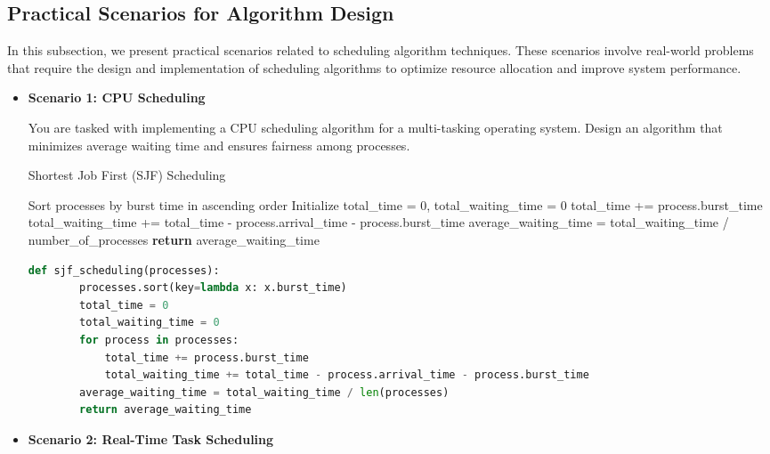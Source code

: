 \documentclass[12pt]{book} %
\begin{document}
\subsection{Practical Scenarios for Algorithm Design}
In this subsection, we present practical scenarios related to scheduling algorithm techniques. These scenarios involve real-world problems that require the design and implementation of scheduling algorithms to optimize resource allocation and improve system performance.

\begin{itemize}
    \item \textbf{Scenario 1: CPU Scheduling}
    
    You are tasked with implementing a CPU scheduling algorithm for a multi-tasking operating system. Design an algorithm that minimizes average waiting time and ensures fairness among processes.
    
    \begin{algorithm}[H]
        \caption{Shortest Job First (SJF) Scheduling}
        \begin{algorithmic}[1]
            \State Sort processes by burst time in ascending order
            \State Initialize total\_time = 0, total\_waiting\_time = 0
                \State total\_time += process.burst\_time
                \State total\_waiting\_time += total\_time - process.arrival\_time - process.burst\_time
            \EndFor
            \State average\_waiting\_time = total\_waiting\_time / number\_of\_processes
            \State \textbf{return} average\_waiting\_time
            \EndProcedure
        \end{algorithmic}
    \end{algorithm}
    
    \FloatBarrier
    \begin{lstlisting}[language=Python, caption=Python Implementation of SJF Scheduling Algorithm]
    def sjf_scheduling(processes):
        processes.sort(key=lambda x: x.burst_time)
        total_time = 0
        total_waiting_time = 0
        for process in processes:
            total_time += process.burst_time
            total_waiting_time += total_time - process.arrival_time - process.burst_time
        average_waiting_time = total_waiting_time / len(processes)
        return average_waiting_time
    \end{lstlisting}
    \FloatBarrier
    
    \item \textbf{Scenario 2: Real-Time Task Scheduling}
    

\end{itemize}
\end{document}
